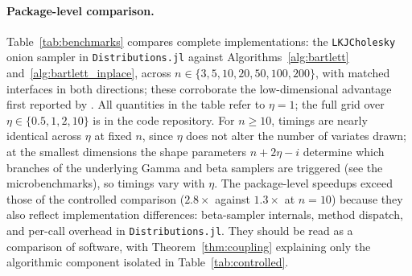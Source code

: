 \documentclass[12pt,english]{article}
\theoremstyle{plain} %
\theoremstyle{definition} %
\theoremstyle{remark} %
\begin{document}
\paragraph{Package-level comparison.}
Table~\ref{tab:benchmarks} compares complete implementations: the \texttt{LKJCholesky} onion sampler in \texttt{Distributions.jl} against Algorithms~\ref{alg:bartlett} and~\ref{alg:bartlett_inplace}, across $n\in\{3,5,10,20,50,100,200\}$, with matched interfaces in both directions; these corroborate the low-dimensional advantage first reported by \citet{WangWuChu:2018}. All quantities in the table refer to $\eta=1$; the full grid over $\eta\in\{0.5,1,2,10\}$ is in the code repository. For $n\geq10$, timings are nearly identical across $\eta$ at fixed $n$, since $\eta$ does not alter the number of variates drawn; at the smallest dimensions the shape parameters $n+2\eta-i$ determine which branches of the underlying Gamma and beta samplers are triggered (see the microbenchmarks), so timings vary with $\eta$. The package-level speedups exceed those of the controlled comparison ($2.8\times$ against $1.3\times$ at $n=10$) because they also reflect implementation differences: beta-sampler internals, method dispatch, and per-call overhead in \texttt{Distributions.jl}. They should be read as a comparison of software, with Theorem~\ref{thm:coupling} explaining only the algorithmic component isolated in Table~\ref{tab:controlled}.
\end{document}

